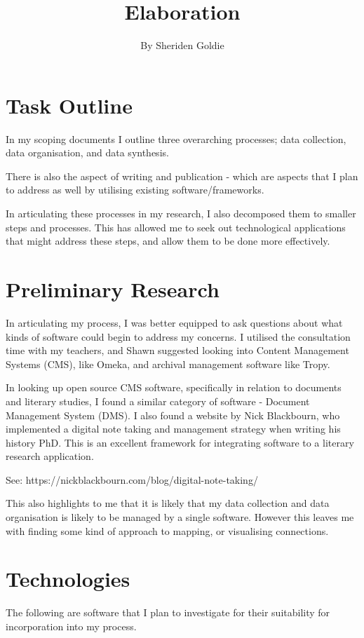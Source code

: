 \documentclass{article}
\title{Elaboration}
\author{By Sheriden Goldie}
\date{}
\begin{document}
\maketitle

\tableofcontents



\section{Task Outline}
In my scoping documents I outline three overarching processes; data collection, data organisation, and data synthesis.

There is also the aspect of writing and publication - which are aspects that I plan to address as well by utilising existing software/frameworks. 

In articulating these processes in my research, I also decomposed them to smaller steps and processes. This has allowed me to seek out technological applications that might address these steps, and allow them to be done more effectively.

\section{Preliminary Research}
In articulating my process, I was better equipped to ask questions about what kinds of software could begin to address my concerns. I utilised the consultation time with my teachers, and Shawn suggested looking into Content Management Systems (CMS), like Omeka, and archival management software like Tropy. 

In looking up open source CMS software, specifically in relation to documents and literary studies, I found a similar category of software - Document Management System (DMS). I also found a website by Nick Blackbourn, who implemented a digital note taking and management strategy when writing his history PhD. This is an excellent framework for integrating software to a literary research application.

See: https://nickblackbourn.com/blog/digital-note-taking/

This also highlights to me that it is likely that my data collection and data organisation is likely to be managed by a single software. However this leaves me with finding some kind of approach to mapping, or visualising connections.

\section{Technologies}
The following are software that I plan to investigate for their suitability for incorporation into my process. 
\end{document}
